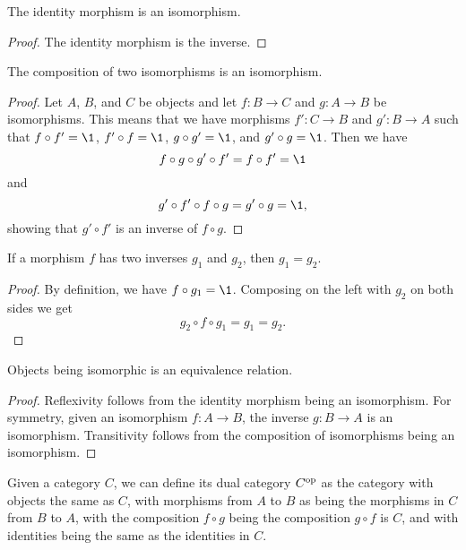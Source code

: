 \documentclass[../math.tex]{subfiles}
\begin{document}
\begin{theorem}
    The identity morphism is an isomorphism.
\end{theorem}
\begin{proof}
    The identity morphism is the inverse.
\end{proof}

\begin{theorem}
    The composition of two isomorphisms is an isomorphism.
\end{theorem}
\begin{proof}
    Let $A$, $B$, and $C$ be objects and let $f : B \to C$ and $g : A \to B$ be
    isomorphisms.  This means that we have morphisms $f' : C \to B$ and $g' : B
    \to A$ such that $f \circ f' = \1$, $f' \circ f = \1$, $g \circ g' = \1$,
    and $g' \circ g = \1$.  Then we have
    \[
        f \circ g \circ g' \circ f' = f \circ f' = \1
    \]
    and
    \[
        g' \circ f' \circ f \circ g = g' \circ g = \1,
    \]
    showing that $g' \circ f'$ is an inverse of $f \circ g$.
\end{proof}

\begin{theorem}
    If a morphism $f$ has two inverses $g_1$ and $g_2$, then $g_1 = g_2$.
\end{theorem}
\begin{proof}
    By definition, we have $f \circ g_1 = \1$.  Composing on the left with $g_2$
    on both sides we get
    \[
        g_2 \circ f \circ g_1 = g_1 = g_2.
    \]
\end{proof}

\begin{theorem}
    Objects being isomorphic is an equivalence relation.
\end{theorem}
\begin{proof}
    Reflexivity follows from the identity morphism being an isomorphism.  For
    symmetry, given an isomorphism $f : A \to B$, the inverse $g : B \to A$ is
    an isomorphism.  Transitivity follows from the composition of isomorphisms
    being an isomorphism.
\end{proof}

\begin{definition}
    Given a category $C$, we can define its dual category $C^{\mathrm{op}}$ as the
    category with objects the same as $C$, with morphisms from $A$ to $B$ as
    being the morphisms in $C$ from $B$ to $A$, with the composition $f \circ g$
    being the composition $g \circ f$ is $C$, and with identities being the same
    as the identities in $C$.
\end{definition}
\end{document}
